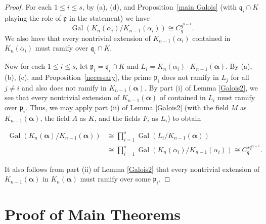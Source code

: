 \documentclass[11pt]{amsart}
\theoremstyle{definition}
\theoremstyle{definition}
\numberwithin{thm}{section}
\numberwithin{equation}{thm}
\renewcommand{\P}{\ensuremath{{\mathbb{P}}}}
\newcommand{\Q}{\ensuremath{{\mathbb{Q}}}}
\newcommand{\fp}{\ensuremath{{\mathfrak{p}}}}
\newcommand{\fq}{\ensuremath{{\mathfrak{q}}}}
\newcommand{\ba}{{\boldsymbol \alpha}}
\DeclareMathOperator{\Gal}{Gal}
\begin{document}
\begin{proof}
  For each $1\le i \le s$, by (a), (d), and Proposition~\ref{main
    Galois} (with $\fq_i \cap K$ playing the role of $\fp$ in the
  statement) we have
  \[\Gal(K_n(\alpha_i)/K_{n-1}(\alpha_i))\cong C_q^{q^{n-1}}.\]
  We also have that every nontrivial extension of $K_{n-1}(\alpha_i)$
  contained in $K_n(\alpha_i)$ must ramify over $\fq_i \cap K$.
   

  Now for each $1\leq i\leq s$, let $\fp_i = \fq_i\cap K$ and
  $L_i = K_n(\alpha_i)\cdot K_{n-1}(\ba)$. By (a), (b), (c), and
  Proposition~\ref{necessary}, the prime $\fp_i$ does not ramify in $L_j$ for
  all $j\neq i$ and also does not ramify in $K_{n-1}(\ba)$.  By part
  (i) of Lemma \ref{Galois2}, we see that every nontrivial extension of
  $K_{n-1}(\ba)$ of contained in $L_i$ must ramify over $\fp_i$.
  Thus, we may apply part (ii) of Lemma \ref{Galois2} (with the
field $M$ as $K_{n-1}(\ba)$, the field $A$ as $K$, and the fields
$F_i$ as $L_i$) to obtain

  \begin{align*}
  \Gal \left(K_n(\ba)/K_{n-1}(\ba)\right)
  & \cong \prod_{i=1}^s \Gal \left(L_i/K_{n-1}(\ba)\right) \\
  & \cong \prod_{i=1}^s \Gal \left(K_n(\alpha_i)/K_{n-1}(\alpha_i)\right)
  \cong C_q ^{sq^{n-1}}.
 \end{align*}

 It also follows from part (ii) of Lemma \ref{Galois2} that every
 nontrivial extension of $K_{n-1}(\ba)$ in $K_n(\ba)$ must ramify over
 some $\fp_i$.  
 

\end{proof}




\section{Proof of Main Theorems}\label{main proof}

\end{document}
